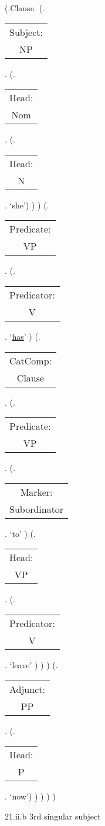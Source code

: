 \documentclass[12pt,letterpaper]{article}
\begin{document}
\begin{figure}
	\begin{center}
		\begin{parsetree}
			(.Clause.
			(.\begin{tabular}{c}Subject:\\NP\end{tabular}.  
			(.\begin{tabular}{c}Head:\\Nom\end{tabular}.
			(.\begin{tabular}{c}Head:\\N\end{tabular}. `she')
			)
			)
			(.\begin{tabular}{c}Predicate:\\VP\end{tabular}.
			(.\begin{tabular}{c}Predicator:\\V\end{tabular}.    `\underline{has}' )
			(.\begin{tabular}{c}CatComp:\\Clause\end{tabular}. 
			(.\begin{tabular}{c}Predicate:\\VP\end{tabular}.
			(.\begin{tabular}{c}Marker:\\Subordinator\end{tabular}.    `to' )
			(.\begin{tabular}{c}Head:\\VP\end{tabular}.
			(.\begin{tabular}{c}Predicator:\\V\end{tabular}.    `leave' )
			)
			)
			(.\begin{tabular}{c}Adjunct:\\PP\end{tabular}. 
			(.\begin{tabular}{c}Head:\\P\end{tabular}. `now')
			)
			)
			)
			)
			
		\end{parsetree}
		\hfill \break \hfill \break
		21.ii.b 3rd singular subject
	\end{center}
\end{figure}
\end{document}
